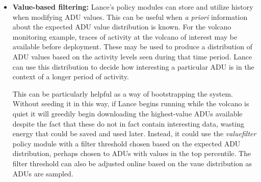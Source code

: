 \begin{itemize}
\item \textbf{Value-based filtering:} Lance's policy modules can store and
utilize history when modifying ADU values. This can be useful when \textit{a
priori} information about the expected ADU value distribution is known. For
the volcano monitoring example, traces of activity at the volcano of interest
may be available before deployment. These may be used to produce a
distribution of ADU values based on the activity levels seen during that time
period. Lance can use this distribution to decide how interesting a
particular ADU is in the context of a longer period of activity.

This can be particularly helpful as a way of bootstrapping the system.
Without seeding it in this way, if Lance begins running while the volcano is
quiet it will greedily begin downloading the highest-value ADUs available
despite the fact that these do not in fact contain interesting data, wasting
energy that could be saved and used later. Instead, it could use the
\textit{valuefilter} policy module with a filter threshold chosen based on
the expected ADU distribution, perhaps chosen to ADUs with values in the top
percentile. The filter threshold can also be adjusted online based on the
vaue distribution as ADUs are sampled.

\end{itemize}
